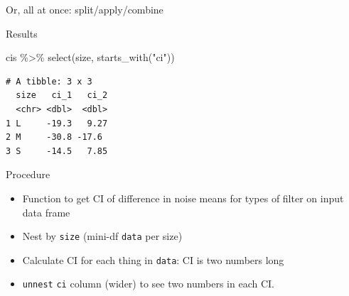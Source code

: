 \documentclass[
  ignorenonframetext,
]{beamer}
\newenvironment{Shaded}{\begin{snugshade}}{\end{snugshade}}
\newcommand{\AttributeTok}[1]{\textcolor[rgb]{0.40,0.45,0.13}{#1}}
\newcommand{\ControlFlowTok}[1]{\textcolor[rgb]{0.00,0.23,0.31}{#1}}
\newcommand{\FunctionTok}[1]{\textcolor[rgb]{0.28,0.35,0.67}{#1}}
\newcommand{\NormalTok}[1]{\textcolor[rgb]{0.00,0.23,0.31}{#1}}
\newcommand{\OtherTok}[1]{\textcolor[rgb]{0.00,0.23,0.31}{#1}}
\newcommand{\SpecialCharTok}[1]{\textcolor[rgb]{0.37,0.37,0.37}{#1}}
\newcommand{\StringTok}[1]{\textcolor[rgb]{0.13,0.47,0.30}{#1}}
\begin{document}
\begin{frame}[fragile]{Or, all at once: split/apply/combine}
\protect\hypertarget{or-all-at-once-splitapplycombine}{}
\begin{Shaded}
\end{Shaded}

\normalsize
\end{frame}

\begin{frame}[fragile]{Results}
\protect\hypertarget{results}{}
\begin{Shaded}
\begin{Highlighting}[]
\NormalTok{cis }\SpecialCharTok{\%\textgreater{}\%} \FunctionTok{select}\NormalTok{(size, }\FunctionTok{starts\_with}\NormalTok{(}\StringTok{"ci"}\NormalTok{))}
\end{Highlighting}
\end{Shaded}

\begin{verbatim}
# A tibble: 3 x 3
  size   ci_1   ci_2
  <chr> <dbl>  <dbl>
1 L     -19.3   9.27
2 M     -30.8 -17.6 
3 S     -14.5   7.85
\end{verbatim}
\end{frame}

\begin{frame}[fragile]{Procedure}
\protect\hypertarget{procedure}{}
\begin{itemize}
\item
  Function to get CI of difference in noise means for types of filter on
  input data frame
\item
  Nest by \texttt{size} (mini-df \texttt{data} per size)
\item
  Calculate CI for each thing in \texttt{data}: CI is two numbers long
\item
  \texttt{unnest} \texttt{ci} column (wider) to see two numbers in each
  CI.
\end{itemize}
\end{frame}
\end{document}
